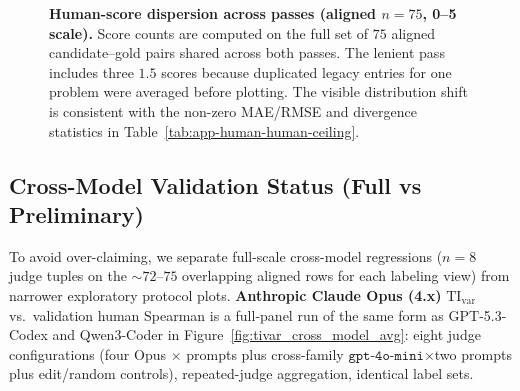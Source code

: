 \documentclass{article}
\begin{document}
\begin{figure}[t]
  \centering
  \caption{\textbf{Human-score dispersion across passes (aligned \(n=75\), 0--5 scale).}
    Score counts are computed on the full set of \(75\) aligned candidate--gold pairs shared across both passes. The lenient pass includes three \(1.5\) scores because duplicated legacy entries for one problem were averaged before plotting. The visible distribution shift is consistent with the non-zero MAE/RMSE and divergence statistics in Table~\ref{tab:app-human-human-ceiling}.}
  \label{fig:app-human-pass-hist}
\end{figure}

\subsection{Cross-Model Validation Status (Full vs Preliminary)}
To avoid over-claiming, we separate full-scale cross-model regressions (\(n{=}8\) judge tuples on the \(\sim\!\!72\)–\(75\) overlapping aligned rows for each labeling view) from narrower exploratory protocol plots.
\textbf{Anthropic Claude Opus (4.x)} \(\mathrm{TI}_{\mathrm{var}}\) vs.\ validation human Spearman is a full-panel run of the same form as GPT-5.3-Codex and Qwen3-Coder in Figure~\ref{fig:tivar_cross_model_avg}: eight judge configurations (four Opus \(\times\) prompts plus cross-family \(\texttt{gpt-4o-mini}\)\(\times\)two prompts plus edit/random controls), repeated-judge aggregation, identical label sets.
\end{document}
